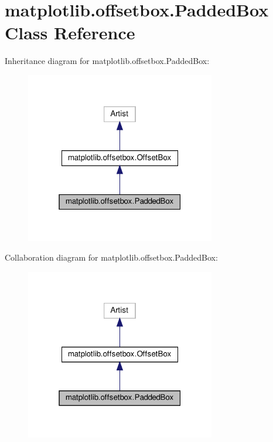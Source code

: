 \hypertarget{classmatplotlib_1_1offsetbox_1_1PaddedBox}{}\section{matplotlib.\+offsetbox.\+Padded\+Box Class Reference}
\label{classmatplotlib_1_1offsetbox_1_1PaddedBox}


Inheritance diagram for matplotlib.\+offsetbox.\+Padded\+Box\+:
\nopagebreak
\begin{figure}[H]
\begin{center}
\leavevmode
\includegraphics[width=235pt]{classmatplotlib_1_1offsetbox_1_1PaddedBox__inherit__graph}
\end{center}
\end{figure}


Collaboration diagram for matplotlib.\+offsetbox.\+Padded\+Box\+:
\nopagebreak
\begin{figure}[H]
\begin{center}
\leavevmode
\includegraphics[width=235pt]{classmatplotlib_1_1offsetbox_1_1PaddedBox__coll__graph}
\end{center}
\end{figure}
